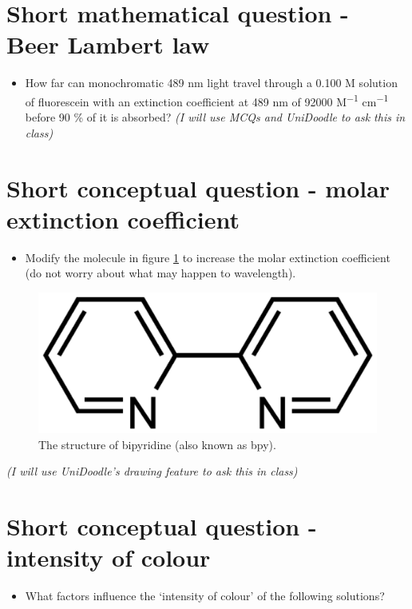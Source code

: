 \documentclass[
]{book}
\providecommand{\tightlist}{%
  \setlength{\itemsep}{0pt}\setlength{\parskip}{0pt}}
\begin{document}
\hypertarget{sec:BeerLambert}{%
\section{Short mathematical question - Beer Lambert law}\label{sec:BeerLambert}}

\begin{itemize}
\tightlist
\item
  How far can monochromatic 489 nm light travel through a 0.100 M solution of fluorescein with an extinction coefficient at 489 nm of 92000 M\textsuperscript{−1} cm\textsuperscript{−1} before 90 \% of it is absorbed?
  \emph{(I will use MCQs and UniDoodle to ask this in class)}
\end{itemize}

\hypertarget{sec:MolarExtinction}{%
\section{Short conceptual question - molar extinction coefficient}\label{sec:MolarExtinction}}

\begin{itemize}
\tightlist
\item
  Modify the molecule in figure \ref{fig:bpy} to increase the molar extinction coefficient (do not worry about what may happen to wavelength).
\end{itemize}

\begin{figure}

{\centering \includegraphics[width=0.3\linewidth]{images/bpy} 

}

\caption{The structure of bipyridine (also known as bpy).}\label{fig:bpy}
\end{figure}

\emph{(I will use UniDoodle's drawing feature to ask this in class)}

\hypertarget{sec:intensity}{%
\section{Short conceptual question - intensity of colour}\label{sec:intensity}}

\begin{itemize}
\tightlist
\item
  What factors influence the `intensity of colour' of the following solutions?
\end{itemize}
\end{document}
